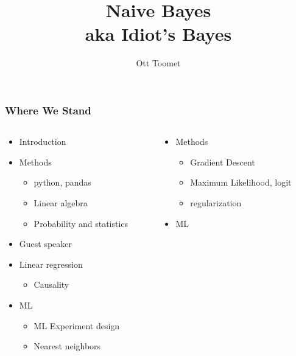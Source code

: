 \documentclass[mathserif, xcolor=table, svgnames]{beamer}
\title[Naive Bayes]{Naive Bayes\\
\normalsize aka Idiot's Bayes}
\author{Ott Toomet}
\begin{document}
\lstset{language=Python}

\begin{frame}
  \maketitle
\end{frame}

\begin{frame}
  \tableofcontents
\end{frame}

\begin{frame}
\frametitle{Where We Stand}
\begin{columns}
  \begin{column}{0.5\linewidth}
    \begin{itemize}
    \item Introduction
    \item Methods
      \begin{itemize}
      \item python, pandas
      \item Linear algebra
      \item Probability and statistics
      \end{itemize}
    \item Guest speaker
    \item Linear regression
      \begin{itemize}
      \item Causality
      \end{itemize}
    \item ML
      \begin{itemize}
      \item ML Experiment design
      \item Nearest neighbors
      \end{itemize}
    \end{itemize}
  \end{column}
  \begin{column}{0.5\linewidth}
    \begin{itemize}
    \item Methods
      \begin{itemize}
      \item Gradient Descent 
      \item Maximum Likelihood, logit
      \item regularization
      \end{itemize}
    \item ML

\end{itemize}
\end{column}
\end{columns}
\end{frame}
\end{document}
